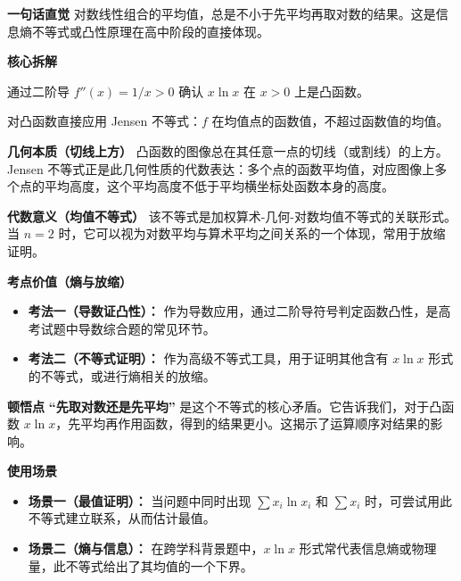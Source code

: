 \begin{explanationbox}
\textbf{\textcolor{CExplanation}{一句话直觉}}
对数线性组合的平均值，总是不小于先平均再取对数的结果。这是信息熵不等式或凸性原理在高中阶段的直接体现。

\medskip
\textbf{\textcolor{CExplanation}{核心拆解}}
\begin{description}[style=nextline, leftmargin=2.8em, labelsep=0.5em, itemsep=0.45em]
    \item[\textbf{要点一（凸函数定义）：}] 通过二阶导 $f''(x)=1/x>0$ 确认 $x\ln x$ 在 $x>0$ 上是凸函数。
    \item[\textbf{要点二（Jensen直接应用）：}] 对凸函数直接应用 Jensen 不等式：$f$ 在均值点的函数值，不超过函数值的均值。
\end{description}

\medskip
\textbf{\textcolor{CExplanation}{几何本质（切线上方）}}
凸函数的图像总在其任意一点的切线（或割线）的上方。Jensen 不等式正是此几何性质的代数表达：多个点的函数平均值，对应图像上多个点的平均高度，这个平均高度不低于平均横坐标处函数本身的高度。

\medskip
\textbf{\textcolor{CExplanation}{代数意义（均值不等式）}}
该不等式是加权算术-几何-对数均值不等式的关联形式。当 $n=2$ 时，它可以视为对数平均与算术平均之间关系的一个体现，常用于放缩证明。

\medskip
\textbf{\textcolor{CExplanation}{考点价值（熵与放缩）}}
\begin{itemize}[leftmargin=*, itemsep=0.5em, topsep=0.4em]
    \item \textbf{考法一（导数证凸性）：} 作为导数应用，通过二阶导符号判定函数凸性，是高考试题中导数综合题的常见环节。
    \item \textbf{考法二（不等式证明）：} 作为高级不等式工具，用于证明其他含有 $x\ln x$ 形式的不等式，或进行熵相关的放缩。
\end{itemize}

\medskip
\textbf{\textcolor{CExplanation}{顿悟点}}
\textbf{“先取对数还是先平均”} 是这个不等式的核心矛盾。它告诉我们，对于凸函数 $x\ln x$，先平均再作用函数，得到的结果更小。这揭示了运算顺序对结果的影响。

\medskip
\textbf{\textcolor{CExplanation}{使用场景}}
\begin{itemize}[leftmargin=*, itemsep=0.5em, topsep=0.4em]
    \item \textbf{场景一（最值证明）：} 当问题中同时出现 $\sum x_i\ln x_i$ 和 $\sum x_i$ 时，可尝试用此不等式建立联系，从而估计最值。
    \item \textbf{场景二（熵与信息）：} 在跨学科背景题中，$x\ln x$ 形式常代表信息熵或物理量，此不等式给出了其均值的一个下界。
\end{itemize}
\end{explanationbox}
